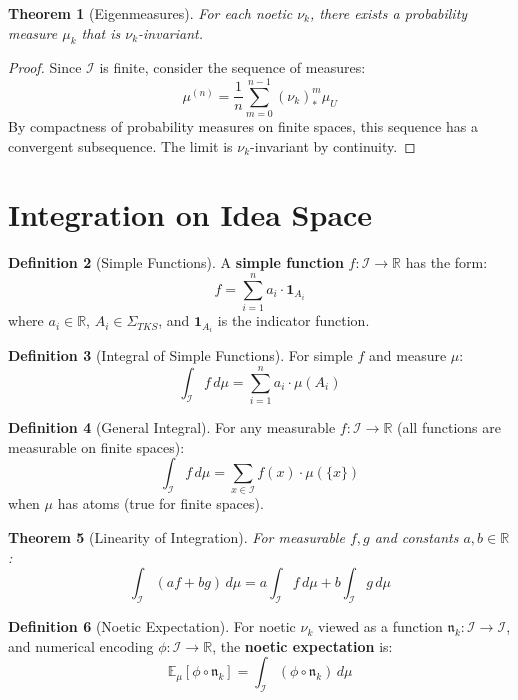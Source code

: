 \documentclass[11pt,twoside,openright]{book}
\theoremstyle{definition}
\newtheorem{definition}{Definition}[chapter]
\theoremstyle{plain}
\newtheorem{theorem}[definition]{Theorem}
\theoremstyle{remark}
\newcommand{\Ideas}{\mathcal{I}}
\newcommand{\noe}[1]{\nu_{#1}}
\newcommand{\SigAlg}{\Sigma}                 %
\newcommand{\intI}{\int_{\Ideas}}            %
\begin{document}
\begin{theorem}[Eigenmeasures]
\label{thm:eigenmeasures}
For each noetic $\noe{k}$, there exists a probability measure $\mu_k$ that is $\noe{k}$-invariant.
\end{theorem}

\begin{proof}
Since $\Ideas$ is finite, consider the sequence of measures:
\[
\mu^{(n)} = \frac{1}{n} \sum_{m=0}^{n-1} (\noe{k})_*^m \mu_U
\]
By compactness of probability measures on finite spaces, this sequence has a convergent subsequence. The limit is $\noe{k}$-invariant by continuity.
\end{proof}

\section{Integration on Idea Space}

\begin{definition}[Simple Functions]
\label{def:simple-functions}
A \textbf{simple function} $f : \Ideas \to \mathbb{R}$ has the form:
\[
f = \sum_{i=1}^n a_i \cdot \mathbf{1}_{A_i}
\]
where $a_i \in \mathbb{R}$, $A_i \in \SigAlg_{TKS}$, and $\mathbf{1}_{A_i}$ is the indicator function.
\end{definition}

\begin{definition}[Integral of Simple Functions]
\label{def:simple-integral}
For simple $f$ and measure $\mu$:
\[
\intI f \, d\mu = \sum_{i=1}^n a_i \cdot \mu(A_i)
\]
\end{definition}

\begin{definition}[General Integral]
\label{def:general-integral}
For any measurable $f : \Ideas \to \mathbb{R}$ (all functions are measurable on finite spaces):
\[
\intI f \, d\mu = \sum_{x \in \Ideas} f(x) \cdot \mu(\{x\})
\]
when $\mu$ has atoms (true for finite spaces).
\end{definition}

\begin{theorem}[Linearity of Integration]
\label{thm:integration-linearity}
For measurable $f, g$ and constants $a, b \in \mathbb{R}$:
\[
\intI (af + bg) \, d\mu = a \intI f \, d\mu + b \intI g \, d\mu
\]
\end{theorem}

\begin{definition}[Noetic Expectation]
\label{def:noetic-expectation}
For noetic $\noe{k}$ viewed as a function $\mathfrak{n}_k : \Ideas \to \Ideas$, and numerical encoding $\phi : \Ideas \to \mathbb{R}$, the \textbf{noetic expectation} is:
\[
\mathbb{E}_\mu[\phi \circ \mathfrak{n}_k] = \intI (\phi \circ \mathfrak{n}_k) \, d\mu
\]
\end{definition}
\end{document}
